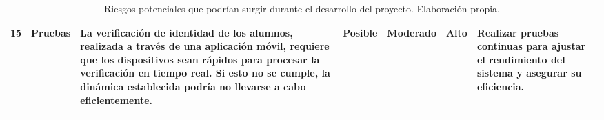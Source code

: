 \begin{longtable}{|c|p{2cm}|p{3cm}|c|p{2cm}|p{2cm}|p{3cm}|}
		15 & Pruebas & La verificación de identidad de los alumnos, realizada a través de una aplicación móvil, requiere que los dispositivos sean rápidos para procesar la verificación en tiempo real. Si esto no se cumple, la dinámica establecida podría no llevarse a cabo eficientemente. & Posible & Moderado & Alto & Realizar pruebas continuas para ajustar el rendimiento del sistema y asegurar su eficiencia. \\ \hline
	\caption{Riesgos potenciales que podrían surgir durante el desarrollo del proyecto. Elaboración propia.}
	\label{tabla:tabla_riesgos}
	\end{longtable}



